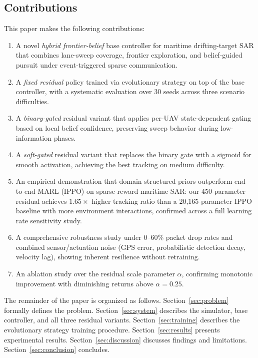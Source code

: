 \documentclass[journal]{IEEEtran}
\begin{document}
\subsection{Contributions}

This paper makes the following contributions:
\begin{enumerate}
  \item A novel \emph{hybrid frontier-belief} base controller for maritime drifting-target
        SAR that combines lane-sweep coverage, frontier exploration, and belief-guided
        pursuit under event-triggered sparse communication.
  \item A \emph{fixed residual} policy trained via evolutionary strategy on top of the
        base controller, with a systematic evaluation over 30 seeds across three
        scenario difficulties.
  \item A \emph{binary-gated} residual variant that applies per-UAV state-dependent
        gating based on local belief confidence, preserving sweep behavior during
        low-information phases.
  \item A \emph{soft-gated} residual variant that replaces the binary gate with a
        sigmoid for smooth activation, achieving the best tracking on medium difficulty.
  \item An empirical demonstration that domain-structured priors outperform end-to-end
        MARL (IPPO) on sparse-reward maritime SAR: our 450-parameter residual achieves
        $1.65\times$ higher tracking ratio than a 20,165-parameter IPPO baseline with
        more environment interactions, confirmed across a full learning rate sensitivity
        study.
  \item A comprehensive robustness study under 0--60\% packet drop rates and combined
        sensor/actuation noise (GPS error, probabilistic detection decay, velocity lag),
        showing inherent resilience without retraining.
  \item An ablation study over the residual scale parameter $\alpha$, confirming
        monotonic improvement with diminishing returns above $\alpha = 0.25$.
\end{enumerate}

The remainder of the paper is organized as follows. Section~\ref{sec:problem} formally
defines the problem. Section~\ref{sec:system} describes the simulator, base controller,
and all three residual variants. Section~\ref{sec:training} describes the evolutionary
strategy training procedure. Section~\ref{sec:results} presents experimental results.
Section~\ref{sec:discussion} discusses findings and limitations. Section~\ref{sec:conclusion}
concludes.
\end{document}
